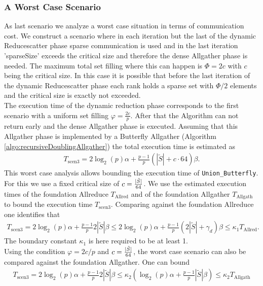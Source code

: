 \subsubsection{A Worst Case Scenario} \label{sec:UnionButterflyWorstCase}
As last scenario we analyze a worst case situation in terms of communication cost. We construct a scenario where in each iteration but the last of the dynamic Reducescatter phase  sparse communication is used and in the last iteration 'sparseSize' exceeds the critical size and therefore the dense Allgather phase is needed. The maximum total set filling where this can happen is $\Phi = 2c$ with $c$ being the critical size. In this case it is possible that before the last iteration of the dynamic Reducescatter phase each rank holds a sparse set with $\Phi/2$ elements and the critical size is exactly not exceeded.\\
The execution time of the dynamic reduction phase corresponds to the first scenario with a uniform set filling $\varphi=\frac{2c}{p}$. After that the Algorithm can not return early  and the dense Allgather phase is executed. Assuming that this Allgather phase is implemented by a Butterfly Allgather (Algorithm \ref{algo:recursiveDoublingAllgather}) the total execution time is estimated as
\begin{align*}
	T_\mathrm{scen3} = 2\log_2(p)\alpha 
	+ \frac{p-1}{p}\left(|\tilde{S}| + c\cdot 64\right)\beta.
\end{align*}
This worst case analysis allows bounding the execution time of \texttt{Union\_Butterfly}. 
For this we use a fixed critical size of $c=\frac{|\Tilde{S}|}{64}$. We use the estimated execution times of the foundation Allreduce $T_\mathrm{Allred}$ and of the foundation Allgather $T_\mathrm{Allgath}$ to bound the execution time $T_\mathrm{scen3}$.
Comparing against the foundation Allreduce one identifies that
\begin{align*}
	T_\mathrm{scen3} = 2\log_2(p)\alpha + \frac{p-1}{p}2|\tilde{S}|\beta
	\leq 2\log_2(p)\alpha + \frac{p-1}{p}(2|\tilde{S}| + \gamma_d)\beta
	\leq \kappa_1 T_\mathrm{Allred}.
\end{align*}
The boundary constant $\kappa_1$ is here required to be at least 1.\\
Using the condition $\varphi=2c/p$ and $c=\frac{|\Tilde{S}|}{64}$, the worst case scenario can also be compared against the foundation Allgather. One can bound
\begin{align*}
	T_\mathrm{scen3} = 2\log_2(p)\alpha + \frac{p-1}{p}2|\tilde{S}|\beta
	\leq \kappa_2 \left(\log_2(p)\alpha + \frac{p-1}{p}|\tilde{S}|\beta \right)
	\leq \kappa_2 T_\mathrm{Allgath}
\end{align*}
